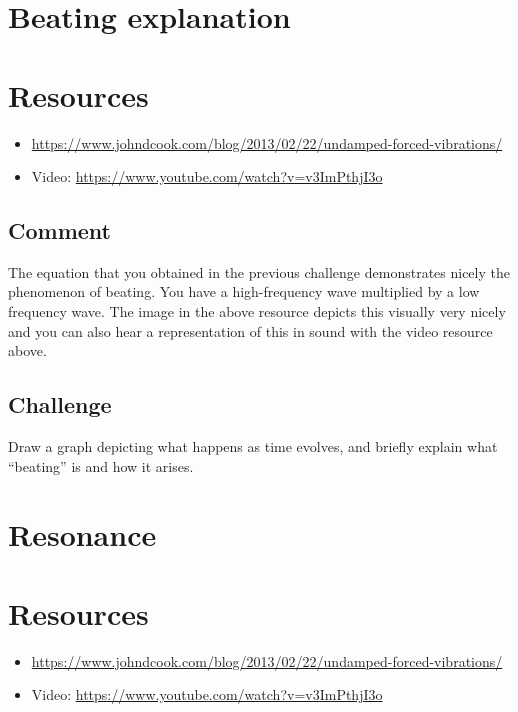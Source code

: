 \newpage
\section{Beating explanation}

\section*{Resources}
\begin{itemize}
    \item \url{https://www.johndcook.com/blog/2013/02/22/undamped-forced-vibrations/}
    \item Video: \url{https://www.youtube.com/watch?v=v3ImPthjI3o}
\end{itemize}

\subsection*{Comment}
The equation that you obtained in the previous challenge demonstrates nicely the phenomenon of beating. You have a high-frequency wave multiplied by a low frequency wave. The image in the above resource depicts this visually very nicely and you can also hear a representation of this in sound with the video resource above.

\subsection*{Challenge}
Draw a graph depicting what happens as time evolves, and briefly explain what ``beating'' is and how it arises.




\newpage
\section{Resonance}

\section*{Resources}
\begin{itemize}
    \item \url{https://www.johndcook.com/blog/2013/02/22/undamped-forced-vibrations/}
    \item Video: \url{https://www.youtube.com/watch?v=v3ImPthjI3o}
\end{itemize}

